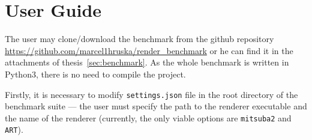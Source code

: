 \documentclass[12pt,a4paper]{report}
\begin{document}



\tableofcontents














\appendix
\chapter{User Guide}
\label{user_guide}
The user may clone/download the benchmark from the github repository \url{https://github.com/marcel1hruska/render_benchmark} or he can find it in the attachments of thesis~\ref{sec:benchmark}. As the whole benchmark is written in Python3, there is no need to compile the project. 

Firstly, it is necessary to modify \texttt{settings.json} file in the root directory of the benchmark suite --- the user must specify the path to the renderer executable and the name of the renderer (currently, the only viable options are \texttt{mitsuba2} and \texttt{ART}).
\end{document}
